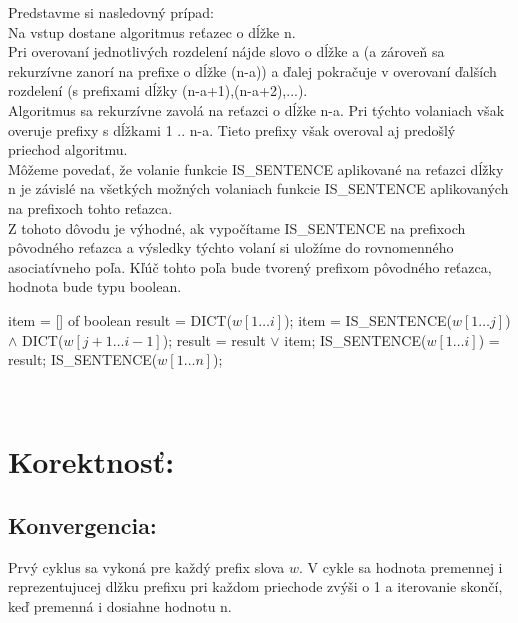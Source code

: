 \documentclass[paper=a4, fontsize=11pt]{scrartcl} %
\numberwithin{equation}{section} %
\numberwithin{figure}{section} %
\numberwithin{table}{section} %
\begin{document}
Predstavme si nasledovný prípad: \ \\
Na vstup dostane algoritmus reťazec o dĺžke n. \ \\
Pri overovaní jednotlivých rozdelení nájde slovo o dĺžke a (a zároveň sa rekurzívne zanorí na prefixe o dĺžke (n-a)) a ďalej pokračuje v overovaní ďalších rozdelení (s prefixami dĺžky (n-a+1),(n-a+2),...). \ \\

Algoritmus sa rekurzívne zavolá na reťazci o dĺžke n-a.
Pri týchto volaniach však overuje prefixy s dĺžkami 1 .. n-a. Tieto prefixy však overoval aj predošlý priechod algoritmu. \ \\

Môžeme povedať, že volanie funkcie IS\_SENTENCE aplikované na reťazci dĺžky n je závislé na všetkých možných volaniach funkcie IS\_SENTENCE aplikovaných na prefixoch tohto reťazca. \ \\

Z tohoto dôvodu je výhodné, ak vypočítame IS\_SENTENCE na prefixoch pôvodného reťazca a výsledky týchto volaní si uložíme do rovnomenného asociatívneho poľa.
Kľúč tohto poľa bude tvorený prefixom pôvodného reťazca, hodnota bude typu boolean. \ \\


\begin{algorithmic}[1]
        \State item = [] of boolean
	\State result = DICT($w[1 \dots i]$);
                \State item = IS\_SENTENCE($w[1 \dots j]$) $\wedge$ DICT($w[j + 1 \dots i - 1]$);
		\State result = result $\vee$ item;
        \EndFor
	\State IS\_SENTENCE($w[1 \dots i]$) = result;
	\EndFor
	\State \Return  IS\_SENTENCE($w[1 \dots n]$);
    \EndFunction	
\end{algorithmic}
\ \\
 
\section*{Korektnosť:}

\subsection*{Konvergencia:}
Prvý cyklus sa vykoná pre každý prefix slova $w$.
V cykle sa hodnota premennej i reprezentujucej dlžku prefixu pri každom priechode zvýši o 1 a iterovanie skončí, keď premenná i dosiahne hodnotu n. \ \\
\end{document}
